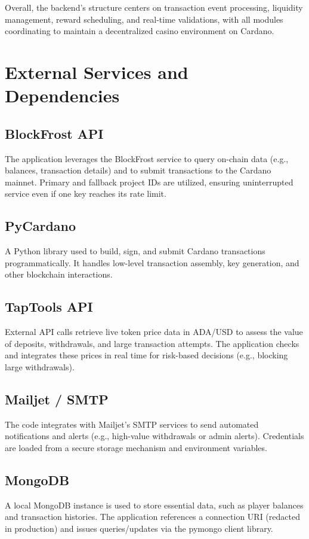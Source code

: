 \documentclass[11pt,a4paper]{report}
\begin{document}
Overall, the backend's structure centers on transaction event processing, liquidity management, reward scheduling, and real-time validations, with all modules coordinating to maintain a decentralized casino environment on Cardano.

\section{External Services and Dependencies}

\subsection{BlockFrost API}
The application leverages the BlockFrost service to query on-chain data (e.g., balances, transaction details) and to submit transactions to the Cardano mainnet. Primary and fallback project IDs are utilized, ensuring uninterrupted service even if one key reaches its rate limit.

\subsection{PyCardano}
A Python library used to build, sign, and submit Cardano transactions programmatically. It handles low-level transaction assembly, key generation, and other blockchain interactions.

\subsection{TapTools API}
External API calls retrieve live token price data in ADA/USD to assess the value of deposits, withdrawals, and large transaction attempts. The application checks and integrates these prices in real time for risk-based decisions (e.g., blocking large withdrawals).

\subsection{Mailjet / SMTP}
The code integrates with Mailjet's SMTP services to send automated notifications and alerts (e.g., high-value withdrawals or admin alerts). Credentials are loaded from a secure storage mechanism and environment variables.

\subsection{MongoDB}
A local MongoDB instance is used to store essential data, such as player balances and transaction histories. The application references a connection URI (redacted in production) and issues queries/updates via the pymongo client library.
\end{document}
